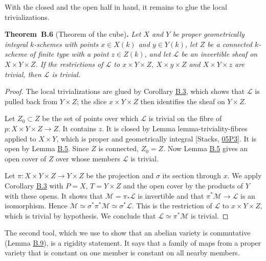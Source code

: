 \documentclass[11pt]{article}
\newenvironment{bpstatement}[2]{\par\addvspace{0.6\baselineskip}\noindent\textbf{#1}#2\textbf{.}\enspace\ignorespaces}
  {\par\addvspace{0.4\baselineskip}}
\newenvironment{bpstatementit}[2]{\begin{bpstatement}{#1}{#2}\itshape\ignorespaces}{\end{bpstatement}}
\begin{document}
\label{bp90}%
With the closed and the open half in hand, it remains to glue the local trivializations.

\label{bp91}%
\begin{bpstatementit}{Theorem~B.6}{ (Theorem of the cube)}
Let \(X\) and \(Y\) be proper geometrically integral \(k\)-schemes with points \(x\in X(k)\) and \(y\in Y(k)\), let \(Z\) be a connected \(k\)-scheme of finite type with a point \(z\in Z(k)\), and let \(\mathcal L\) be an invertible sheaf on \(X\times Y\times Z\). If the restrictions of \(\mathcal L\) to \(x\times Y\times Z\), \(X\times y\times Z\) and \(X\times Y\times z\) are trivial, then \(\mathcal L\) is trivial.
\end{bpstatementit}

\begin{proof}[{Proof}]\label{bp92}%
The local trivializations are glued by Corollary \hyperref[bp83]{B.3}, which shows that \(\mathcal L\) is pulled back from \(Y\times Z\); the slice \(x\times Y\times Z\) then identifies the sheaf on \(Y\times Z\).

Let \(Z_0\subset Z\) be the set of points over which \(\mathcal L\) is trivial on the fibre of \(p:X\times Y\times Z\to Z\). It contains \(z\). It is closed by Lemma lemma-triviality-fibres applied to \(X\times Y\), which is proper and geometrically integral [Stacks, \href{https://stacks.math.columbia.edu/tag/05P3}{05P3}]. It is open by Lemma \hyperref[bp88]{B.5}. Since \(Z\) is connected, \(Z_0=Z\). Now Lemma \hyperref[bp88]{B.5} gives an open cover of \(Z\) over whose members \(\mathcal L\) is trivial.

Let \(\pi:X\times Y\times Z\to Y\times Z\) be the projection and \(\sigma\) its section through \(x\). We apply Corollary \hyperref[bp83]{B.3} with \(P=X\), \(T=Y\times Z\) and the open cover by the products of \(Y\) with these opens. It shows that \(\mathcal M=\pi_*\mathcal L\) is invertible and that \(\pi^*\mathcal M\to\mathcal L\) is an isomorphism. Hence \(\mathcal M\simeq\sigma^*\pi^*\mathcal M\simeq\sigma^*\mathcal L\). This is the restriction of \(\mathcal L\) to \(x\times Y\times Z\), which is trivial by hypothesis. We conclude that \(\mathcal L\simeq\pi^*\mathcal M\) is trivial.
\end{proof}

\label{bp93}%
The second tool, which we use to show that an abelian variety is commutative (Lemma \hyperref[bp100]{B.9}), is a rigidity statement. It says that a family of maps from a proper variety that is constant on one member is constant on all nearby members.
\end{document}
